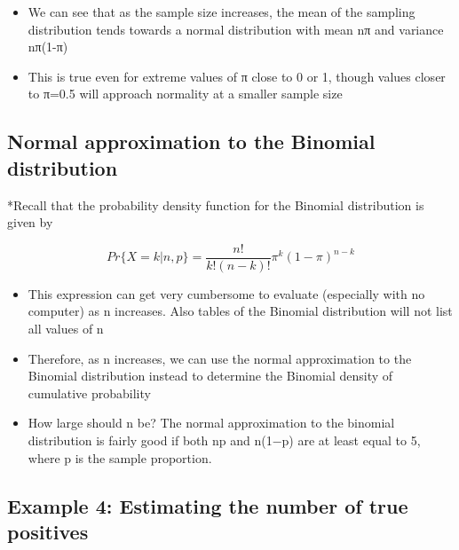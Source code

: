 \documentclass[
]{book}
\providecommand{\tightlist}{%
  \setlength{\itemsep}{0pt}\setlength{\parskip}{0pt}}
\begin{document}
\begin{itemize}
\tightlist
\item
  We can see that as the sample size increases, the mean of the sampling distribution tends towards a normal distribution with mean nπ and variance nπ(1-π)
\item
  This is true even for extreme values of π close to 0 or 1, though values closer to π=0.5 will approach normality at a smaller sample size
\end{itemize}

\hypertarget{normal-approximation-to-the-binomial-distribution}{%
\subsection{Normal approximation to the Binomial distribution}\label{normal-approximation-to-the-binomial-distribution}}

*Recall that the probability density function for the Binomial distribution is given by

\[Pr\{X=k|n,p\}=\frac{n!}{k!(n-k)!}\pi^k(1-\pi)^{n-k}\]

\begin{itemize}
\tightlist
\item
  This expression can get very cumbersome to evaluate (especially with no computer) as n increases. Also tables of the Binomial distribution will not list all values of n
\item
  Therefore, as n increases, we can use the normal approximation to the Binomial distribution instead to determine the Binomial density of cumulative probability
\item
  How large should n be? The normal approximation to the binomial distribution is fairly good if both np and n(1−p) are at least equal to 5, where p is the sample proportion.
\end{itemize}

\hypertarget{example-4-estimating-the-number-of-true-positives}{%
\subsection{Example 4: Estimating the number of true positives}\label{example-4-estimating-the-number-of-true-positives}}
\end{document}
